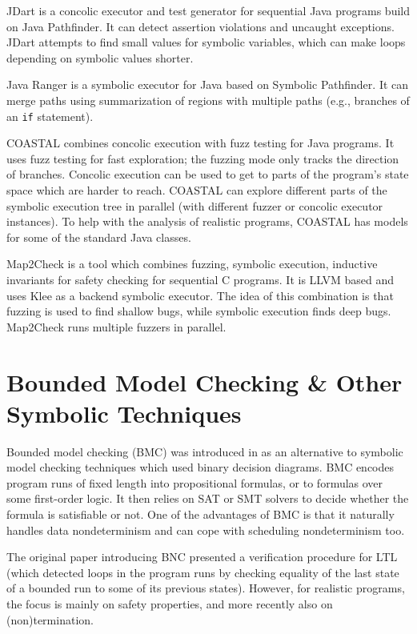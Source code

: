 JDart  is a concolic executor and test generator for sequential Java programs build on Java Pathfinder.
It can detect assertion violations and uncaught exceptions.
JDart attempts to find small values for symbolic variables, which can make loops depending on symbolic values shorter.

Java Ranger  is a symbolic executor for Java based on Symbolic Pathfinder.
It can merge paths using summarization of regions with multiple paths (e.g., branches of an \texttt{if} statement). %

COASTAL  combines concolic execution with fuzz testing for Java programs.
It uses fuzz testing for fast exploration; the fuzzing mode only tracks the direction of branches.
Concolic execution can be used to get to parts of the program's state space which are harder to reach.
COASTAL can explore different parts of the symbolic execution tree in parallel (with different fuzzer or concolic executor instances).
To help with the analysis of realistic programs, COASTAL has models for some of the standard Java classes. %

Map2Check  is a tool which combines fuzzing, symbolic execution, inductive invariants for safety checking for sequential C programs.
It is LLVM based and uses Klee as a backend symbolic executor.
The idea of this combination is that fuzzing is used to find shallow bugs, while symbolic execution finds deep bugs.
Map2Check runs multiple fuzzers in parallel.



\section{Bounded Model Checking \& Other Symbolic Techniques}\label{sec:stateoftheart:bmc}

Bounded model checking (BMC) was introduced in  as an alternative to
symbolic model checking techniques which used binary decision diagrams.
BMC encodes program runs of fixed length into propositional formulas, or to
formulas over some first-order logic.
It then relies on SAT or SMT solvers to decide whether the formula is satisfiable
or not.
One of the advantages of BMC is that it naturally handles data nondeterminism and can cope with scheduling nondeterminism too.

The original paper introducing BNC presented a verification procedure for LTL
(which detected loops in the program runs by checking equality of the last
state of a bounded run to some of its previous states).
However, for realistic programs, the focus is mainly on safety properties, and
more recently also on (non)termination.

